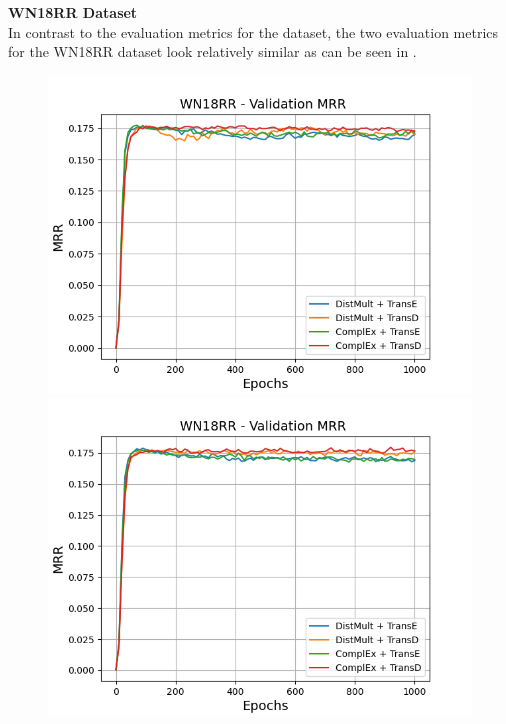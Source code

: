 \textbf{WN18RR Dataset}
\label{subsubsec:methods_wn18rr}\\
%
In contrast to the evaluation metrics for the \umls dataset, the two evaluation metrics for the \textsc{WN18RR} dataset look relatively similar as can be seen in .
\begin{figure}[H]
    \centering
    \begin{minipage}{.5\textwidth}
      \centering
      \includegraphics[width=0.9\linewidth]{figures/results/gan_train/not_pretrained/uncertainty/max/entropy/wn18rr/1k_epochs/uncertainty_wn18rr_mrrs.png}
    \end{minipage}%
    \begin{minipage}{.5\textwidth}
      \centering
      \includegraphics[width=0.9\linewidth]{figures/results/gan_train/not_pretrained/uncertainty/max_distribution/entropy/wn18rr/1k_epochs/uncertainty_wn18rr_mrrs.png}

\end{minipage}
\end{figure}
